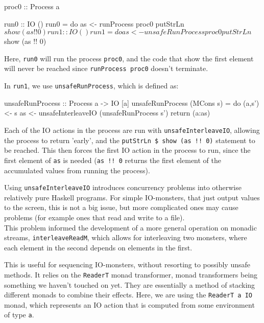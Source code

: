 \begin{haskell}
proc0 :: Process a

run0 :: IO ()
run0 = do as <- runProcess proc0
          putStrLn $ show (as !! 0)

run1 :: IO ()
run1 = do as <- unsafeRunProcess proc0
          putStrLn $ show (as !! 0)
\end{haskell}

Here, \verb+run0+ will run the process \verb+proc0+, and the code that show the first element will never be reached since \verb+runProcess proc0+ doesn't terminate.

In \verb+run1+, we use \verb+unsafeRunProcess+, which is defined as:

\begin{haskell}
unsafeRunProcess :: Process a -> IO [a]
unsafeRunProcess (MCons s) = 
	do (a,s') <- s
	   as     <- unsafeInterleaveIO (unsafeRunProcess s')
	   return (a:as)
\end{haskell}

Each of the IO actions in the process are run with \verb+unsafeInterleaveIO+, allowing the process to return 'early', and the \verb+putStrLn $ show (as !! 0)+ statement to be reached. This then forces the first IO action in the process to run, since the first element of \verb+as+ is needed (\verb+as !! 0+ returns the first element of the accumulated values from running the process).

Using \verb+unsafeInterleaveIO+ introduces concurrency problems into otherwise relatively pure Haskell programs. For simple IO-monsters, that just output values to the screen, this is not a big issue, but more complicated ones may cause problems (for example ones that read and write to a file). \\

This problem informed the development of a more general operation on monadic streams, \verb+interleaveReadM+, which allows for interleaving two monsters, where each element in the second depends on elements in the first.


This is useful for sequencing IO-monsters, without resorting to possibly unsafe methods. It relies on the \verb+ReaderT+ monad transformer, monad transformers being something we haven't touched on yet. They are essentially a method of stacking different monads to combine their effects. Here, we are using the \verb+ReaderT a IO+ monad, which represents an IO action that is computed from some environment of type \verb+a+. 

